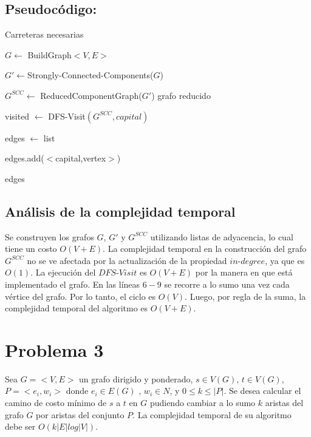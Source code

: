 \documentclass[a4paper,10pt]{article}
\begin{document}
	\subsection{Pseudoc\'odigo:}   
	
	\begin{algorithm}[H] 
		\caption{Carreteras necesarias}            
		\begin{algorithmic}[1]
			\label{MinimumRoads}
			\State $G \gets$ BuildGraph$<V,E>$
			
			\State $G' \gets $Strongly-Connected-Components($G$)   
			
			\State $G^{SCC} \gets$ ReducedComponentGraph($G'$)    \Comment grafo reducido
			
			\State visited $\gets$ DFS-Visit$(G^{SCC},capital)$
			
			\State edges $\gets$ list    
			
			\State edges.add($<$capital,vertex$>$)
			\EndIf
			\EndFor
			
			 edges       
		\end{algorithmic}
	\end{algorithm} 
	\subsection{Análisis de la complejidad temporal}
	Se construyen los grafos $G$, $G'$ y $G^{SCC}$ utilizando listas de adyacencia, lo cual tiene un costo $O(V+E)$. La complejidad temporal en la construcci\'on del grafo $G^{SCC}$ no se ve afectada por la actualizaci\'on de la propiedad $in$-$degree$, ya que es $O(1)$. La ejecuci\'on del $DFS$-$Visit$ es $O(V+E)$ por la manera en que est\'a implementado el grafo. En las l\'ineas $6-9$ se recorre a lo sumo una vez cada v\'ertice del grafo. Por lo tanto, el ciclo es $O(V)$. Luego, por regla de la suma, la complejidad temporal del algoritmo es $O(V+E)$.
	\section{Problema 3}
	Sea $G = <V,E>$ un grafo dirigido y ponderado, $s \in V (G)$, $t \in V (G)$, $P = {<e_i,w_i>}$ donde $e_i \in E(G)$ , $w_i  \in N$, y $0 \leq k \leq |P|$. Se desea calcular el camino de costo mínimo de $s$ a $t$ en $G$ pudiendo cambiar a lo sumo $k$ aristas del grafo $G$ por aristas del conjunto $P$. La complejidad temporal de su algoritmo debe ser $O(k|E|log|V |)$.
	
\end{document}
